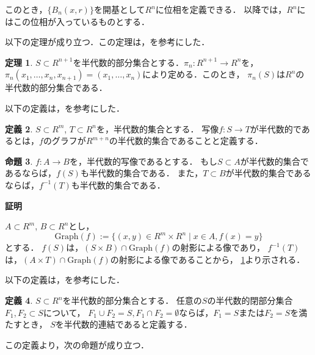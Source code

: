 \documentclass[uplatex, dvipdfmx]{jsarticle}
\makeatletter
\numberwithin{equation}{section}
\renewenvironment{proof}[1][\proofname]{\par
  \pushQED{\qed}%
  \normalfont \topsep6\p@\@plus6\p@\relax
  \trivlist
  \item\relax
  {\bfseries
  #1\@addpunct{.}}\hspace\labelsep\ignorespaces
}{
  \popQED\endtrivlist\@endpefalse
}
\newcommand{\map}[3]{{#1}\colon{#2}\rightarrow{#3}}
\theoremstyle{definition}
\newtheorem{definition}{定義}[section]
\newtheorem{proposition}[definition]{命題}
\newtheorem{theorem}[definition]{定理}
\renewcommand{\proofname}{\textbf{証明}}
\makeatother
\begin{document}
このとき，$\{B_n(x,r)\}$を開基として$R^n$に位相を定義できる．
以降では，$R^n$にはこの位相が入っているものとする．

以下の定理が成り立つ．この定理は，\cite[Theorem 2.2.1]{MR1659509}を参考にした．
\begin{theorem}\label{theorem:Tarski-Seidenberg}
     $S \subset R^{n+1}$を半代数的部分集合とする．$\map{\pi_{n}}{R^{n+1}}{R^n}$を，
     $\pi_{n}(x_1, \dots, x_n, x_{n+1}) = (x_1, \dots, x_n)$により定める．このとき，
     $\pi_{n}(S)$は$R^n$の半代数的部分集合である．
\end{theorem}

以下の定義は，\cite[Definition 2.2.5.]{MR1659509}を参考にした．
\begin{definition}
     $S \subset R^m$, $T \subset R^n$を，半代数的集合とする．
     写像$\map{f}{S}{T}$が半代数的であるとは，$f$のグラフが$R^{m+n}$の半代数的集合であることと定義する．
\end{definition}

\begin{proposition}
     $\map{f}{A}{B}$を，半代数的写像であるとする．
     もし$S \subset A$が半代数的集合であるならば，$f(S)$も半代数的集合である．
     また，$T \subset B$が半代数的集合であるならば，$f^{-1}(T)$も半代数的集合である．
\end{proposition}

\begin{proof}
     $A \subset R^m$, $B \subset R^n$とし，
     \begin{equation}
          \mathrm{Graph}(f) := \{(x,y) \in R^m \times R^n \mid x \in A, f(x) = y\}
     \end{equation}
     とする．
     $f(S)$は，$(S \times B) \cap \mathrm{Graph}(f)$の射影による像であり，
     $f^{-1}(T)$は，$(A \times T) \cap \mathrm{Graph}(f)$の射影による像であることから，
     \cref{theorem:Tarski-Seidenberg}より示される．
\end{proof}

以下の定義は，\cite[Definition 2.4.2.]{MR1659509}を参考にした．
\begin{definition}
     $S \subset R^n$を半代数的部分集合とする．
     任意の$S$の半代数的閉部分集合$F_1, F_2 \subset S$について，
     $F_1 \cup F_2 = S, F_1 \cap F_2 = \emptyset$ならば，$F_1 = S$または$F_2 = S$を満たすとき，
     $S$を半代数的連結であると定義する．
\end{definition}

この定義より，次の命題が成り立つ．
\end{document}
